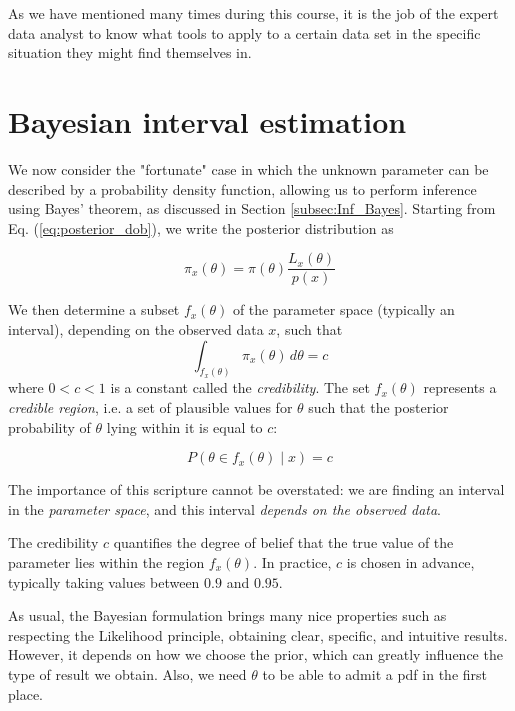 As we have mentioned many times during this course, it is the job of the expert data analyst to know what tools to apply to a certain data set in the specific situation they might find themselves in. 

\section{Bayesian interval estimation}
We now consider the "fortunate" case in which the unknown parameter can be described by a probability density function, allowing us to perform inference using Bayes' theorem, as discussed in Section \ref{subsec:Inf_Bayes}. Starting from Eq. (\ref{eq:posterior_dob}), we write the posterior distribution as
	
	\[
	\pi_x(\theta) = \pi(\theta)\frac{L_x(\theta)}{p(x)}
	\]

We then determine a subset $f_{x}(\theta)$ of the parameter space (typically an interval), depending on the observed data $x$, such that
\begin{equation}
	\int_{f_{x}(\theta)} \pi_x(\theta)\, d\theta = c
	\label{eq:Bayes_int_eq}
\end{equation}
where $0 < c < 1$ is a constant called the \emph{credibility}. The set $f_{x}(\theta)$ represents a \emph{credible region}, i.e. a set of plausible values for $\theta$ such that the posterior probability of $\theta$ lying within it is equal to $c$:
	
	\[
	P(\theta \in f_{x}(\theta)\mid x) = c
	\]

The importance of this scripture cannot be overstated: we are finding an interval in the \emph{parameter space}, and this interval \emph{depends on the observed data}.

The credibility $c$ quantifies the degree of belief that the true value of the parameter lies within the region $f_{x}(\theta)$. In practice, $c$ is chosen in advance, typically taking values between $0.9$ and $0.95$.

As usual, the Bayesian formulation brings many nice properties such as respecting the Likelihood principle, obtaining clear, specific, and intuitive results. However, it depends on how we choose the prior, which can greatly influence the type of result we obtain. Also, we need $\theta$ to be able to admit a pdf in the first place.

